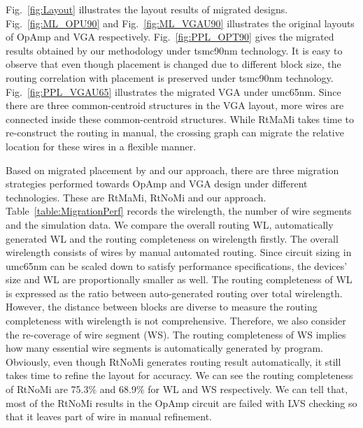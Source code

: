       Fig.~\ref{fig:Layout} illustrates the layout results of migrated designs. Fig.~\ref{fig:ML_OPU90} and Fig.~\ref{fig:ML_VGAU90} illustrates the original layouts of OpAmp and VGA respectively. Fig.~\ref{fig:PPL_OPT90} gives the migrated results obtained by our methodology under tsmc90nm technology. It is easy to observe that even though placement is changed due to different block size, the routing correlation with placement is preserved under tsmc90nm technology. Fig.~\ref{fig:PPL_VGAU65} illustrates the migrated VGA under umc65nm. Since there are three common-centroid structures in the VGA layout, more wires are connected inside these common-centroid structures. While RtMaMi takes time to re-construct the routing in manual, the crossing graph can migrate the relative location for these wires in a flexible manner.


      Based on migrated placement by \cite{msc-bhattacharya-tcad06} and our approach, there are three migration strategies performed towards OpAmp and VGA design under different technologies. These are RtMaMi, RtNoMi and our approach. Table~\ref{table:MigrationPerf} records the wirelength, the number of wire segments and the simulation data. We compare the overall routing WL, automatically generated WL and the routing completeness on wirelength firstly. The overall wirelength consists of wires by manual automated routing. Since circuit sizing in umc65nm can be scaled down to satisfy performance specifications, the devices' size and WL are proportionally smaller as well. The routing completeness of WL is expressed as the ratio between auto-generated routing over total wirelength. However, the distance between blocks are diverse to measure the routing completeness with wirelength is not comprehensive. Therefore, we also consider the re-coverage of wire segment (WS). The routing completeness of WS implies how many essential wire segments is automatically generated by program. Obviously, even though RtNoMi generates routing result automatically, it still takes time to refine the layout for accuracy. We can see the routing completeness of RtNoMi are 75.3\% and 68.9\% for WL and WS respectively. We can tell that, most of the RtNoMi results in the OpAmp circuit are failed with LVS checking so that it leaves part of wire in manual refinement.

